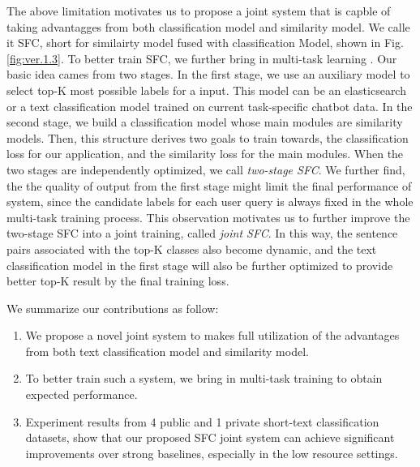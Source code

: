 \documentclass[letterpaper]{article} %
\begin{document}
  The  above limitation motivates us to propose a joint system that is capble of
  taking  advantagges  from  both  classification model and similarity model. We
  calle  it  SFC,  short  for  similairty model fused with classification Model,
  shown  in  Fig.  \ref{fig:ver.1.3}.  To  better train SFC, we further bring in
  multi-task   learning   \cite{caruana1993multitask,collobert2008unified}.  Our
  basic  idea  cames  from  two  stages. In the first stage, we use an auxiliary
  model  to  select top-K most possible labels for a input. This model can be an
  elasticsearch  \cite{divya2013elasticsearch}  or  a  text classification model
  trained on current task-specific chatbot data. In the second stage, we build a
  classification  model  whose  main modules are similarity models. Then, this
  structure  derives two goals to train towards, the classification loss for our
  application,  and the similarity loss for the main modules. When the two stages
  are  independently  optimized,  we call \emph{two-stage SFC}. We further find,
  the  the  quality  of  output  from  the  first  stage  might  limit the final
  performance  of  system,  since  the  candidate  labels for each user query is
  always  fixed  in  the  whole  multi-task  training  process. This observation
  motivates  us  to  further  improve  the  two-stage SFC into a joint training,
  called  \emph{joint  SFC}. In this way, the sentence pairs associated with the
  top-K  classes  also  become dynamic, and the text classification model in the
  first  stage  will also be further optimized to provide better top-K result by
  the final training loss.


  We summarize our contributions as follow:
  \begin{enumerate}
    \item We propose a novel joint system to makes full utilization of
    the advantages from both text classification model and similarity model.

    \item To  better  train such a system, we bring in multi-task training to obtain
    expected performance.

    \item Experiment  results  from 4 public and 1 private short-text classification
    datasets,  show  that  our  proposed  SFC joint system can achieve significant
    improvements over strong baselines, especially in the low resource settings.
  \end{enumerate}
\end{document}
